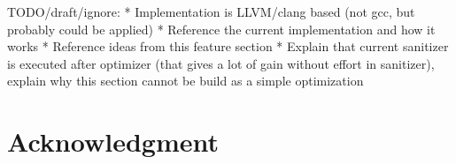 \documentclass[letterpaper, 10 pt]{llncs}
\let\cite\parencite
\begin{document}
TODO/draft/ignore:
* Implementation is LLVM/clang based (not gcc, but probably could be applied)
* Reference the current implementation \cite{serebryany2012addresssanitizer} and how it works
* Reference \cite{serebryany2012addresssanitizer} ideas from this feature section
* Explain that current sanitizer is executed after optimizer (that gives a lot of gain without effort in sanitizer), explain why this section cannot be build as a simple optimization




\addtolength{\textheight}{-12cm}   %








\section*{Acknowledgment}



\printbibliography
\end{document}
